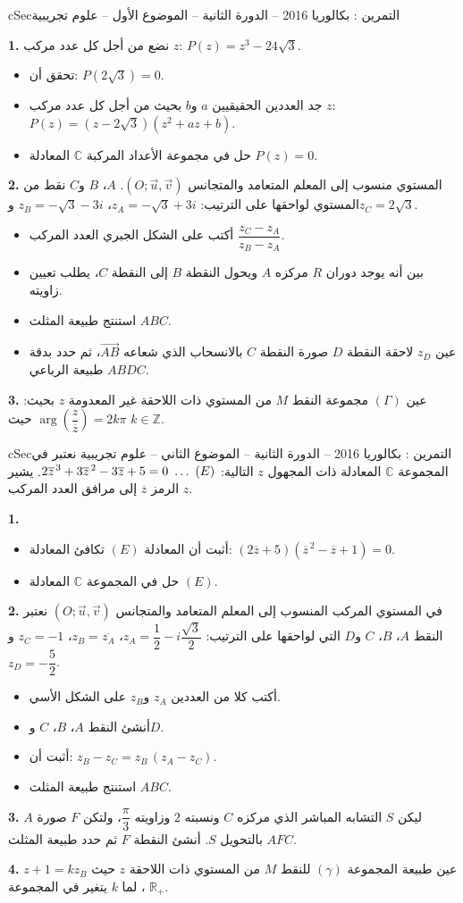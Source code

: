 \documentclass[12pt,a4paper]{article}
\newenvironment{BOX}[2]{\begin{otherlanguage}{english}\begin{arbox}{#1}{#2}}{\end{arbox}\end{otherlanguage}}
\newcounter{exo}
\newenvironment{tamrin}[1]{\stepcounter{exo}\begin{BOX}{cSec}{التمرين \theexo: #1}}{\end{BOX}}
\renewcommand{\ldots}{\mathinner{\ldotp\ldotp\ldotp}}
\newenvironment{sq}{\begin{itemize}[leftmargin=2.4em,itemsep=3pt]}{\end{itemize}}
\newcommand{\qa}{\item[(أ)]}\newcommand{\qb}{\item[(ب)]}\newcommand{\qc}{\item[(جـ)]}\newcommand{\qd}{\item[(د)]}\newcommand{\qe}{\item[(هـ)]}
\newcommand{\QQ}[1]{\par\smallskip\textbf{#1.} }
\begin{document}
\begin{tamrin}{بكالوريا 2016 -- الدورة الثانية -- الموضوع الأول -- علوم تجريبية}
\QQ{1} نضع من أجل كل عدد مركب $z$: $P(z)=z^3-24\sqrt3$.
\begin{sq}
\qa تحقق أن: $P\left(2\sqrt3\right)=0$.
\qb جد العددين الحقيقيين $a$ و$b$ بحيث من أجل كل عدد مركب $z$: $P(z)=\left(z-2\sqrt3\right)\left(z^2+az+b\right)$.
\qc حل في مجموعة الأعداد المركبة $\mathbb{C}$ المعادلة $P(z)=0$.
\end{sq}
\QQ{2} المستوي منسوب إلى المعلم المتعامد والمتجانس $(O;\vec u,\vec v)$. $A$، $B$ و$C$ نقط من المستوي لواحقها على الترتيب: $z_A=-\sqrt3+3i$، $z_B=-\sqrt3-3i$ و$z_C=2\sqrt3$.
\begin{sq}
\qa أكتب على الشكل الجبري العدد المركب $\dfrac{z_C-z_A}{z_B-z_A}$.
\qb بين أنه يوجد دوران $R$ مركزه $A$ ويحول النقطة $B$ إلى النقطة $C$، يطلب تعيين زاويته.
\qc استنتج طبيعة المثلث $ABC$.
\qd عين $z_D$ لاحقة النقطة $D$ صورة النقطة $C$ بالانسحاب الذي شعاعه $\overrightarrow{AB}$، ثم حدد بدقة طبيعة الرباعي $ABDC$.
\end{sq}
\QQ{3} عين $(\Gamma)$ مجموعة النقط $M$ من المستوي ذات اللاحقة غير المعدومة $z$ بحيث: $\arg\left(\dfrac{z}{\overline{z}}\right)=2k\pi$ حيث $k\in\mathbb{Z}$.
\end{tamrin}

\begin{tamrin}{بكالوريا 2016 -- الدورة الثانية -- الموضوع الثاني -- علوم تجريبية}
نعتبر في المجموعة $\mathbb{C}$ المعادلة ذات المجهول $z$ التالية: $2\overline{z}^{\,3}+3\overline{z}^{\,2}-3\overline{z}+5=0\ \ldots\ (E)$.
يشير الرمز $\overline{z}$ إلى مرافق العدد المركب $z$.
\QQ{1}
\begin{sq}
\qa أثبت أن المعادلة $(E)$ تكافئ المعادلة: $\left(2\overline{z}+5\right)\left(\overline{z}^{\,2}-\overline{z}+1\right)=0$.
\qb حل في المجموعة $\mathbb{C}$ المعادلة $(E)$.
\end{sq}
\QQ{2} في المستوي المركب المنسوب إلى المعلم المتعامد والمتجانس $(O;\vec u,\vec v)$ نعتبر النقط $A$، $B$، $C$ و$D$ التي لواحقها على الترتيب: $z_A=\dfrac12-i\dfrac{\sqrt3}{2}$، $z_B=\overline{z_A}$، $z_C=-1$ و$z_D=-\dfrac52$.
\begin{sq}
\qa أكتب كلا من العددين $z_A$ و$z_B$ على الشكل الأسي.
\qb أنشئ النقط $A$، $B$، $C$ و$D$.
\qc أثبت أن: $z_B-z_C=z_B\,(z_A-z_C)$.
\qd استنتج طبيعة المثلث $ABC$.
\end{sq}
\QQ{3} ليكن $S$ التشابه المباشر الذي مركزه $C$ ونسبته $2$ وزاويته $\dfrac{\pi}{3}$، ولتكن $F$ صورة $A$ بالتحويل $S$.
أنشئ النقطة $F$ ثم حدد طبيعة المثلث $AFC$.
\QQ{4} عين طبيعة المجموعة $(\gamma)$ للنقط $M$ من المستوي ذات اللاحقة $z$ حيث $z+1=kz_B$، لما $k$ يتغير في المجموعة $\mathbb{R}_+$.
\end{tamrin}
\end{document}
